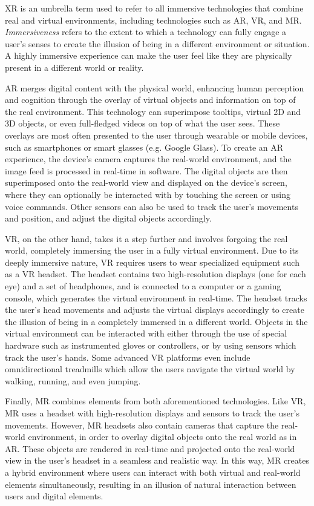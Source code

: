 \gls{XR} is an umbrella term used to refer to all immersive technologies that combine real and virtual environments, including technologies such as \gls{AR}, \gls{VR}, and \gls{MR}.
\emph{Immersiveness} refers to the extent to which a technology can fully engage a user's senses to create the illusion of being in a different environment or situation.
A highly immersive experience can make the user feel like they are physically present in a different world or reality.

\gls{AR} merges digital content with the physical world, enhancing human perception and cognition through the overlay of virtual objects and information on top of the real environment.
This technology can superimpose tooltips, virtual \gls{2D} and \gls{3D} objects, or even full-fledged videos on top of what the user sees.
These overlays are most often presented to the user through wearable or mobile devices, such as smartphones or smart glasses (e.g. Google Glass).
To create an \gls{AR} experience, the device's camera captures the real-world environment, and the image feed is processed in real-time in software.
The digital objects are then superimposed onto the real-world view and displayed on the device's screen, where they can optionally be interacted with by touching the screen or using voice commands.
Other sensors can also be used to track the user's movements and position, and adjust the digital objects accordingly.

\gls{VR}, on the other hand, takes it a step further and involves forgoing the real world, completely immersing the user in a fully virtual environment.
Due to its deeply immersive nature, \gls{VR} requires users to wear specialized equipment such as a \gls{VR} headset.
The headset contains two high-resolution displays (one for each eye) and a set of headphones, and is connected to a computer or a gaming console, which generates the virtual environment in real-time.
The headset tracks the user's head movements and adjusts the virtual displays accordingly to create the illusion of being in a completely immersed in a different world.
Objects in the virtual environment can be interacted with either through the use of special hardware such as instrumented gloves or controllers, or by using sensors which track the user's hands.
Some advanced \gls{VR} platforms even include omnidirectional treadmills which allow the users navigate the virtual world by walking, running, and even jumping. 

Finally, \gls{MR} combines elements from both aforementioned technologies.
Like \gls{VR}, \gls{MR} uses a headset with high-resolution displays and sensors to track the user's movements.
However, \gls{MR} headsets also contain cameras that capture the real-world environment, in order to overlay digital objects onto the real world as in \gls{AR}.
These objects are rendered in real-time and projected onto the real-world view in the user's headset in a seamless and realistic way.
In this way, \gls{MR} creates a hybrid environment where users can interact with both virtual and real-world elements simultaneously, resulting in an illusion of natural interaction between users and digital elements.

